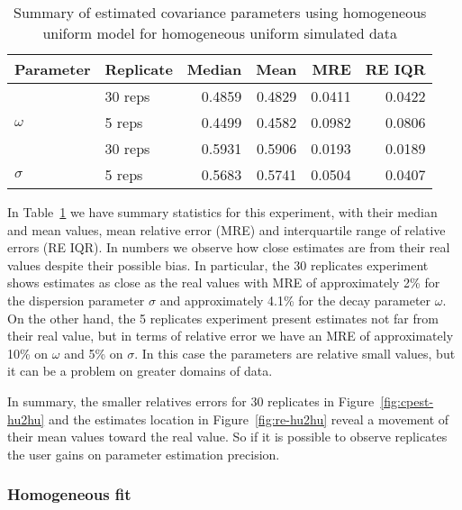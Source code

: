 \begin{table}[b]\centering
\caption{Summary of estimated covariance parameters using homogeneous uniform model for homogeneous uniform simulated data}
\begin{knitrout}
\color{fgcolor}
\begin{tabular}{llrrrr}
\toprule
Parameter & Replicate & Median & Mean & MRE & RE IQR\\
\midrule
 & 30 reps & 0.4859 & 0.4829 & 0.0411 & 0.0422\\

\multirow{-2}{*}{\raggedright\arraybackslash $\omega$} & 5 reps & 0.4499 & 0.4582 & 0.0982 & 0.0806\\
\cmidrule{1-6}
 & 30 reps & 0.5931 & 0.5906 & 0.0193 & 0.0189\\

\multirow{-2}{*}{\raggedright\arraybackslash $\sigma$} & 5 reps & 0.5683 & 0.5741 & 0.0504 & 0.0407\\
\bottomrule
\end{tabular}


\end{knitrout}
\label{tab:par-hu2hu}
\end{table}


In Table~\ref{tab:par-hu2hu} we have summary statistics for this experiment, with their median and mean values, mean relative error (MRE) and interquartile range of relative errors (RE IQR). In numbers we observe how close estimates are from their real values despite their possible bias. In particular, the 30 replicates experiment shows estimates as close as the real values with MRE of approximately 2\% for the dispersion parameter $\sigma$ and approximately 4.1\% for the decay parameter $\omega$. %
On the other hand, the 5 replicates experiment present estimates not far from their real value, but in terms of relative error we have an MRE of approximately 10\% on $\omega$ and 5\% on $\sigma$. In this case the parameters are relative small values, but it can be a problem on greater domains of data.


In summary, the smaller relatives errors for 30 replicates in Figure~\ref{fig:cpest-hu2hu} and the estimates location in Figure~\ref{fig:re-hu2hu} reveal a movement of their mean values toward the real value. So if it is possible to observe replicates the user gains on parameter estimation precision.


\subsubsection{Homogeneous fit}
\label{sec:mc2homog}


